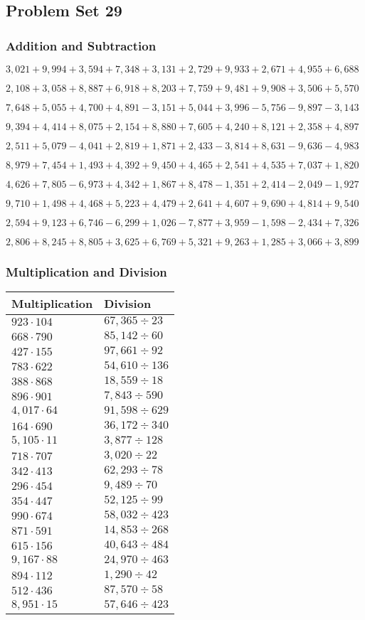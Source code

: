 \hypertarget{problem-set-29-3}{%
\subsection{Problem Set 29}\label{problem-set-29-3}}

\hypertarget{addition-and-subtraction-191}{%
\subsubsection{Addition and
Subtraction}\label{addition-and-subtraction-191}}

\(3,021+9,994+3,594+7,348+3,131+2,729+9,933+2,671+4,955+ 6,688\)

\(2,108+3,058+8,887+6,918+8,203+7,759+9,481+9,908+3,506+5,570\)

\(7,648+5,055+4,700+4,891-3,151+5,044+3,996-5,756-9,897-3,143\)

\(9,394+4,414+8,075+2,154+8,880+7,605+4,240+8,121+2,358+4,897\)

\(2,511+5,079-4,041+2,819+1,871+2,433-3,814+8,631-9,636-4,983\)

\(8,979+7,454+1,493+4,392+9,450+4,465+2,541+4,535+7,037+1,820\)

\(4,626+7,805-6,973+4,342+1,867+8,478-1,351+2,414-2,049-1,927\)

\(9,710+1,498+4,468+5,223+4,479+2,641+4,607+9,690+4,814+9,540\)

\(2,594+9,123+6,746-6,299+1,026-7,877+3,959-1,598-2,434+7,326\)

\(2,806+8,245+8,805+3,625+6,769+5,321+9,263+1,285+3,066+3,899\)

\hypertarget{multiplication-and-division-190}{%
\subsubsection{Multiplication and
Division}\label{multiplication-and-division-190}}

\begin{longtable}[]{@{}ll@{}}
\toprule
Multiplication & Division\tabularnewline
\midrule
\endhead
\(923\cdot104\) & \(67,365÷23\)\tabularnewline
\(668\cdot790\) & \(85,142÷60\)\tabularnewline
\(427\cdot155\) & \(97,661÷92\)\tabularnewline
\(783\cdot622\) & \(54,610÷136\)\tabularnewline
\(388\cdot868\) & \(18,559÷18\)\tabularnewline
\(896\cdot901\) & \(7,843÷590\)\tabularnewline
\(4,017\cdot64\) & \(91,598÷629\)\tabularnewline
\(164\cdot690\) & \(36,172÷340\)\tabularnewline
\(5,105\cdot11\) & \(3,877÷128\)\tabularnewline
\(718\cdot707\) & \(3,020÷22\)\tabularnewline
\(342\cdot413\) & \(62,293÷78\)\tabularnewline
\(296\cdot454\) & \(9,489÷70\)\tabularnewline
\(354\cdot447\) & \(52,125÷99\)\tabularnewline
\(990\cdot674\) & \(58,032÷423\)\tabularnewline
\(871\cdot591\) & \(14,853÷268\)\tabularnewline
\(615\cdot156\) & \(40,643÷484\)\tabularnewline
\(9,167\cdot88\) & \(24,970÷463\)\tabularnewline
\(894\cdot112\) & \(1,290÷42\)\tabularnewline
\(512\cdot436\) & \(87,570÷58\)\tabularnewline
\(8,951\cdot15\) & \(57,646÷423\)\tabularnewline
\bottomrule
\end{longtable}

